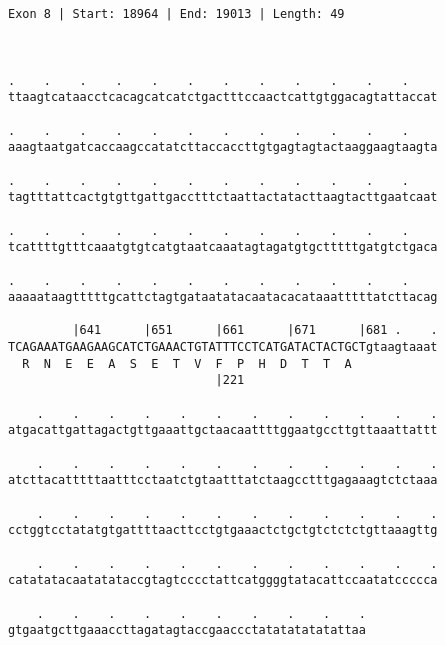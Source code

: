 \documentclass{article}
\begin{document}
\begin{Verbatim}
Exon 8 | Start: 18964 | End: 19013 | Length: 49



.    .    .    .    .    .    .    .    .    .    .    .    
ttaagtcataacctcacagcatcatctgactttccaactcattgtggacagtattaccat
                                                            
.    .    .    .    .    .    .    .    .    .    .    .    
aaagtaatgatcaccaagccatatcttaccaccttgtgagtagtactaaggaagtaagta
                                                            
.    .    .    .    .    .    .    .    .    .    .    .    
tagtttattcactgtgttgattgacctttctaattactatacttaagtacttgaatcaat
                                                            
.    .    .    .    .    .    .    .    .    .    .    .    
tcattttgtttcaaatgtgtcatgtaatcaaatagtagatgtgctttttgatgtctgaca
                                                            
.    .    .    .    .    .    .    .    .    .    .    .    
aaaaataagtttttgcattctagtgataatatacaatacacataaatttttatcttacag
                                                            
         |641      |651      |661      |671      |681 .    .
TCAGAAATGAAGAAGCATCTGAAACTGTATTTCCTCATGATACTACTGCTgtaagtaaat
  R  N  E  E  A  S  E  T  V  F  P  H  D  T  T  A            
                             |221                           
  
    .    .    .    .    .    .    .    .    .    .    .    .
atgacattgattagactgttgaaattgctaacaattttggaatgccttgttaaattattt
                                                            
    .    .    .    .    .    .    .    .    .    .    .    .
atcttacatttttaatttcctaatctgtaatttatctaagcctttgagaaagtctctaaa
                                                            
    .    .    .    .    .    .    .    .    .    .    .    .
cctggtcctatatgtgattttaacttcctgtgaaactctgctgtctctctgttaaagttg
                                                            
    .    .    .    .    .    .    .    .    .    .    .    .
catatatacaatatataccgtagtcccctattcatggggtatacattccaatatccccca
                                                            
    .    .    .    .    .    .    .    .    .    .
gtgaatgcttgaaaccttagatagtaccgaaccctatatatatatattaa
                                                  

\end{Verbatim}
\end{document}
